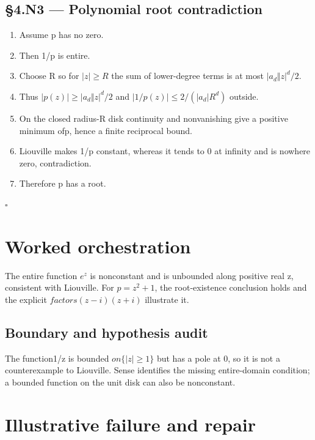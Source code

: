 \documentclass[preprint,12pt,aps,pra,showkeys,amsmath,amssymb,superscriptaddress,floatfix]{revtex4-2}
\theoremstyle{definition}
\theoremstyle{remark}
\begin{document}
\subsection{§4.N3 --- Polynomial root
contradiction}\label{n3-polynomial-root-contradiction}

\begin{enumerate}
\def\labelenumi{\arabic{enumi}.}
\item
  Assume p has no zero.
\item
  Then 1/p is entire.
\item
  Choose R so for \(|z|\ge R\) the sum of lower-degree terms is at most
  \(|a_d\Vert z|^d/2\).
\item
  Thus \(|p(z)|\ge |a_d\Vert z|^d/2\) and \(|1/p(z)|\le 2/(|a_d|R^d)\)
  outside.
\item
  On the closed radius-R disk continuity and nonvanishing give a
  positive minimum of\textbar p\textbar, hence a finite reciprocal
  bound.
\item
  Liouville makes 1/p constant, whereas it tends to 0 at infinity and is
  nowhere zero, contradiction.
\item
  Therefore p has a root.
\end{enumerate}

\hfill$\square$

\section{Worked orchestration}

The entire function \(e^z\) is nonconstant and is unbounded along
positive real z, consistent with Liouville. For \(p=z^{2}+1\), the
root-existence conclusion holds and the explicit \(factors(z-i)(z+i)\)
illustrate it.

\subsection{Boundary and hypothesis audit}

The function1/z is bounded \(on\{|z|\ge 1\}\) but has a pole at 0, so it
is not a counterexample to Liouville. Sense identifies the missing
entire-domain condition; a bounded function on the unit disk can also be
nonconstant.

\section{Illustrative failure and repair}
\end{document}
